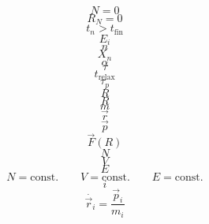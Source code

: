\documentclass{scrreprt}
\begin{document}
\begin{equation}
N=0
\end{equation}
\begin{equation}
R_N=0
\end{equation}
\begin{equation}
t_n > t_\text{fin}
\end{equation}
\begin{equation}
E_i
\end{equation}
\begin{equation}
n
\end{equation}
\begin{equation}
X_n
\end{equation}
\begin{equation}
\alpha
\end{equation}
\begin{equation}
\tau
\end{equation}
\begin{equation}
t_\text{relax}
\end{equation}
\begin{equation}
\tau_p
\end{equation}
\begin{equation}
R
\end{equation}
\begin{equation}
R
\end{equation}
\begin{equation}
m
\end{equation}
\begin{equation}
\vec r
\end{equation}
\begin{equation}
\vec p
\end{equation}
\begin{equation}
\vec{F}(R)
\end{equation}
\begin{equation}
N
\end{equation}
\begin{equation}
V
\end{equation}
\begin{equation}
E
\end{equation}
\begin{equation}
  N = \text{const.}
  \qquad
  V = \text{const.}
  \qquad
  E = \text{const.}
\end{equation}
\begin{equation}
i
\end{equation}
\begin{equation}
  \dot{\vec r_i} = \frac{\vec p_i}{m_i}
\end{equation}
\end{document}
